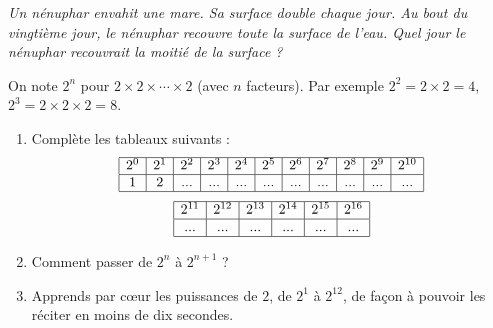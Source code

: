 \documentclass[class=report,crop=false, 12pt]{standalone}
\begin{document}

\emph{Un nénuphar envahit une mare. Sa surface double chaque jour. Au bout du vingtième jour, le nénuphar recouvre toute la surface de l'eau. Quel jour le nénuphar recouvrait la moitié de la surface ?}

\bigskip
\bigskip


\begin{activite}

On note $2^n$ pour $2 \times 2 \times \cdots \times 2$ (avec $n$ facteurs). Par exemple $2^2 = 2 \times 2  = 4$, $2^3 = 2 \times 2 \times 2 = 8$. 

\begin{enumerate}
  \item  Complète les tableaux suivants :
$$
\begin{array}{|c|c|c|c|c|c|c|c|c|c|c|}
  \hline  
  2^0 & 2^1 & 2^2 & 2^3 & 2^4 & 2^5 & 2^6 & 2^7 & 2^8 & 2^9 & 2^{10}  \\
  \hline  
   1  &  2  & ... & ... & ... & ... & ... & ... & ... & ... & ...   \\ 
  \hline

\end{array}
$$
$$
\begin{array}{|c|c|c|c|c|c|c|c|c|c|c|}
  \hline
  2^{11} & 2^{12} & 2^{13} & 2^{14} & 2^{15} & 2^{16}  \\
  \hline
  ... &  ...   &  ...   &  ...   &  ...   &  ...  \\ 
  \hline
\end{array}
$$  


  \item Comment passer de $2^{n}$ à $2^{n+1}$ ?
  
  \item Apprends par c\oe ur les puissances de $2$, de $2^1$ à $2^{12}$, de façon à pouvoir les réciter en moins de dix secondes.
  
\end{enumerate}
\end{activite}
\end{document}

